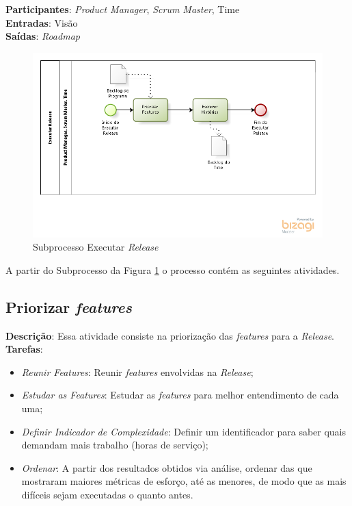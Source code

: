   \textbf{Participantes}: \textit{Product Manager}, \textit{Scrum Master}, Time \\

  \textbf{Entradas}: Visão \\

  \textbf{Saídas}:  \textit{Roadmap}\\

\begin{figure}[!htb]
\centering
\includegraphics[scale=0.7]{figuras/release.png}
\caption{Subprocesso Executar \textit{Release}}
\label{fig:release}
\end{figure}

A partir do Subprocesso da Figura \ref{fig:release} o processo contém as seguintes atividades.

\subsection{Priorizar \textit{features}}
  \textbf{Descrição}: Essa atividade consiste na priorização das \textit{features} para a \textit{Release}. \\

  \textbf{Tarefas}:
  \begin{itemize}
   \item \indent \textit{Reunir \textit{Features}}: Reunir \textit{features} envolvidas na \textit{Release};

   \item \indent \textit{Estudar as \textit{Features}}: Estudar as \textit{features} para melhor entendimento de cada uma;

   \item \indent \textit{Definir Indicador de Complexidade}: Definir um identificador para saber quais demandam mais trabalho (horas de serviço);

   \item \indent \textit{Ordenar}: A partir dos resultados obtidos via análise, ordenar das que mostraram maiores métricas de esforço, até as menores, de modo que as mais difíceis sejam executadas o quanto antes.
  \end{itemize}

